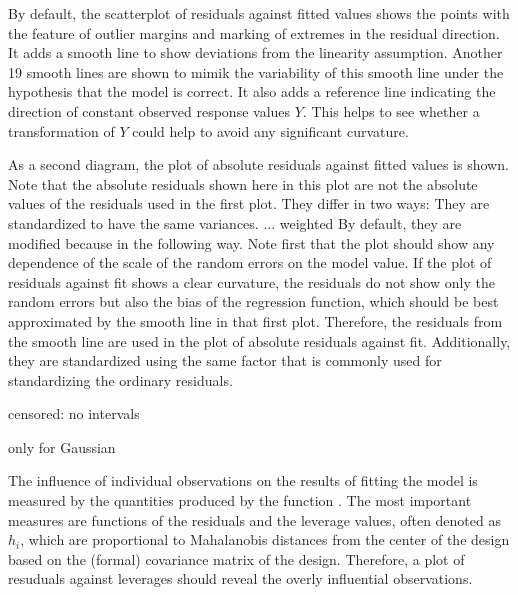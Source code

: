 \documentclass[11pt]{article}\usepackage[]{graphicx}\usepackage[]{color}
\begin{document}
By default, the scatterplot of residuals against fitted values shows
the points with the feature of outlier margins and marking of extremes in
the residual direction. It adds a smooth line to show deviations from
the linearity assumption. Another 19 smooth lines are shown to 
mimik the variability of this smooth line under the hypothesis that the
model is correct.
It also adds a reference line indicating the direction of constant observed
response values $Y$. This helps to see whether a transformation of $Y$
could help to avoid any significant curvature.


As a second diagram, the plot of absolute residuals against fitted values
is shown.
Note that the absolute residuals shown here in this plot are not the 
absolute values of the residuals used in the first plot. 
They differ in two ways:
\Itm
They are standardized to have the same variances.
... weighted
\Itm
By default, they are modified because in the following way.
Note first that the plot should show any dependence of the scale of the
random errors on the model value.
If the plot of residuals against fit shows a clear curvature, the
residuals do not show only the random errors but also the bias of the
regression function, which should be best approximated by the smooth line
in that first plot. Therefore, the residuals from the smooth line are 
used in the plot of absolute residuals against fit.
Additionally, they are standardized using the same factor that is commonly
used for standardizing the ordinary residuals.

censored: no intervals

only for Gaussian

The influence of individual observations on the results of fitting the model
is measured by the quantities produced by the function .
The most important measures are functions of the residuals and the 
leverage values, often denoted as $h_i$, which are proportional to
Mahalanobis distances from the center of the design based on the 
(formal) covariance matrix of the design.
Therefore, a plot of resuduals against leverages should reveal the overly
influential observations.
\end{document}
